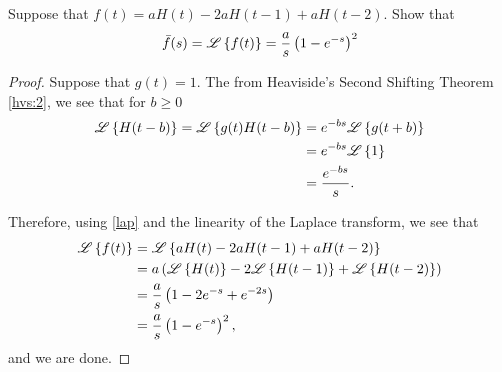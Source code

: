 \begin{problem}{3.34}
  Suppose that $f(t) = aH(t) -2a H(t-1) +aH(t-2)$. Show that
  \begin{align*}
    \bar{f}(s) = \mathscr{L}\left\{ {f(t)} \right\} = \frac{a}{s}\left(1-e^{-s}\right)^2
  \end{align*}
\end{problem}

\begin{proof}
  Suppose that $g(t) = 1$. The from Heaviside's Second Shifting Theorem \eqref{hvs:2},
  we see that for $b \geq 0$
  \begin{align}\label{lap}
    \mathscr{L}\left\{ {H(t-b)} \right\} = \mathscr{L}\left\{ {g(t)H(t-b)} \right\}
    &= e^{-bs}\mathscr{L}\left\{ {g(t+b)} \right\} \notag \\
    &= e^{-bs}\mathscr{L}\left\{ {1} \right\} \notag \\
    &= \frac{e^{-bs}}{s}.
  \end{align}

  Therefore, using \eqref{lap} and the linearity of the Laplace transform, we see that
  \begin{align*}
    \mathscr{L}\left\{ {f(t)} \right\} &= \mathscr{L}\left\{ {aH(t) -2a H(t-1) +aH(t-2)} \right\} \\
    &= a\left(\mathscr{L}\left\{ {H(t)} \right\} -2 \mathscr{L}\left\{ {H(t-1)} \right\} + \mathscr{L}\left\{ {H(t-2)} \right\}\right) \\
    &= \frac{a}{s}\left(1 - 2e^{-s} + e^{-2s}\right) \\
    &= \frac{a}{s}\left(1-e^{-s}\right)^2,
  \end{align*}
  and we are done.
\end{proof}
\newpage
